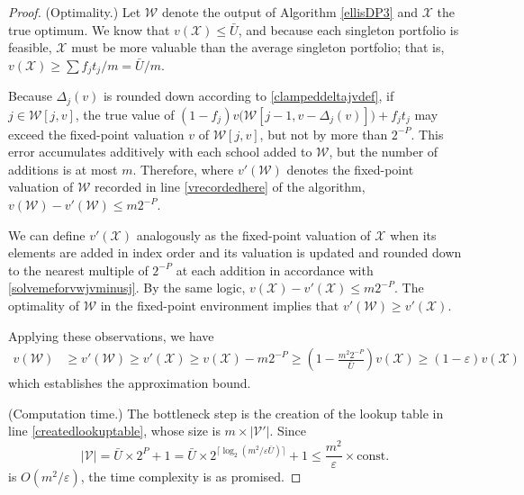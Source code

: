 \begin{proof}
(Optimality.) Let $\mathcal{W}$ denote the output of Algorithm \ref{ellisDP3} and $\mathcal{X}$ the true optimum. We know that $v(\mathcal{X}) \leq \bar U$, and because each singleton portfolio is feasible, $\mathcal{X}$ must be more valuable than the average singleton portfolio; that is, $v(\mathcal{X}) \geq \sum f_j t_j / m = \bar U / m$.

Because $\Delta_j(v)$ is rounded down according to \eqref{clampeddeltajvdef}, if $j \in \mathcal{W}[j, v]$, the true value of $(1 - f_j) v\bigl(\mathcal{W}[j-1, v- \Delta_j(v)]\bigr) + f_j t_j$ may exceed the fixed-point valuation $v$ of $\mathcal{W}[j, v]$, but not by more than $2^{-P}$. This error accumulates additively with each school added to $\mathcal{W}$, but the number of additions is at most $m$. Therefore, where $v'(\mathcal{W})$ denotes the fixed-point valuation of $\mathcal{W}$ recorded in line \ref{vrecordedhere} of the algorithm, 
$v(\mathcal{W}) - v'(\mathcal{W}) \leq m 2^{-P}$.

We can define $v'(\mathcal{X})$ analogously as the fixed-point valuation of $\mathcal{X}$ when its elements are added in index order and its valuation is updated and rounded down to the nearest multiple of $2^{-P}$ at each addition in accordance with \eqref{solvemeforvwjvminusj}. By the same logic, 
$v(\mathcal{X}) - v'(\mathcal{X}) \leq m 2^{-P}$. The optimality of $\mathcal{W}$ in the fixed-point environment implies that $v'(\mathcal{W}) \geq v'(\mathcal{X})$. 

Applying these observations, we have
\begin{equation}
\begin{split}
v(\mathcal{W}) &\geq v'(\mathcal{W}) \geq v'(\mathcal{X})
\geq v(\mathcal{X}) - m 2^{-P}
\geq \left(1 - \frac{m^2 2^{-P}}{\bar U}\right) v(\mathcal{X})
\geq \left(1 - \varepsilon\right) v(\mathcal{X})
\end{split}
\end{equation}
which establishes the approximation bound. 

(Computation time.) The bottleneck step is the creation of the lookup table in line \ref{createdlookuptable}, whose size is $m \times |\mathcal{V}'|$. Since
\begin{equation}
|\mathcal{V}| = \bar U \times 2^{P} + 1 = \bar U \times 2^ { \bigl\lceil\log_{2}\left(m ^2/ \varepsilon \bar U\right)\bigr\rceil} + 1
\leq\frac{m^2}{\varepsilon} \times \text{const.}
\end{equation}
is $O(m^2/ \varepsilon)$, the time complexity is as promised.
\end{proof}

